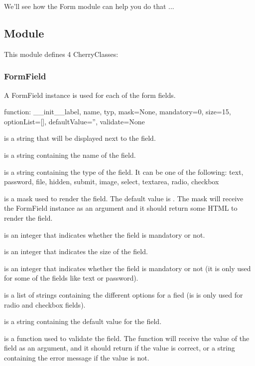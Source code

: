 We'll see how the Form module can help you do that ...

\subsection{Module}

This module defines 4 CherryClasses:

\subsubsection{FormField}
A FormField instance is used for each of the form fields.

\begin{funcdesc}{function: __init__}{label, name, typ, mask=None, mandatory=0, size=15, optionList=[], defaultValue='', validate=None}

 is a string that will be displayed next to the field.

 is a string containing the name of the field.

 is a string containing the type of the field. It can be one of the following:
text, password, file, hidden, submit, image, select, textarea, radio, checkbox

 is a mask used to render the field. The default value is . The mask will receive
the FormField instance as an argument and it should return some HTML to render the field.

 is an integer that indicates whether the field is mandatory or not.

 is an integer that indicates the size of the field.

 is an integer that indicates whether the field is mandatory or not (it is only used for some of the fields
like text or password).

 is a list of strings containing the different options for a fied (is is only used for
radio and checkbox fields).

 is a string containing the default value for the field.

 is a function used to validate the field. The function will receive the value of the field as an argument,
and it should return  if the value is correct, or a string containing the error message if the value is not.

\end{funcdesc}

